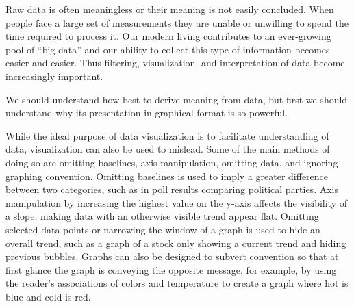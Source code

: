 \documentclass[]{book}
\theoremstyle{definition}
\theoremstyle{definition}
\theoremstyle{definition}
\theoremstyle{remark}
\begin{document}
Raw data is often meaningless or their meaning is not easily concluded.
When people face a large set of measurements they are unable or
unwilling to spend the time required to process it. Our modern living
contributes to an ever-growing pool of ``big data'' and our ability to
collect this type of information becomes easier and easier. Thus
filtering, visualization, and interpretation of data become increasingly
important.

We should understand how best to derive meaning from data, but first we
should understand why its presentation in graphical format is so
powerful.

While the ideal purpose of data visualization is to facilitate
understanding of data, visualization can also be used to mislead. Some
of the main methods of doing so are omitting baselines, axis
manipulation, omitting data, and ignoring graphing convention. Omitting
baselines is used to imply a greater difference between two categories,
such as in poll results comparing political parties. Axis manipulation
by increasing the highest value on the y-axis affects the visibility of
a slope, making data with an otherwise visible trend appear flat.
Omitting selected data points or narrowing the window of a graph is used
to hide an overall trend, such as a graph of a stock only showing a
current trend and hiding previous bubbles. Graphs can also be designed
to subvert convention so that at first glance the graph is conveying the
opposite message, for example, by using the reader's associations of
colors and temperature to create a graph where hot is blue and cold is
red.
\end{document}
